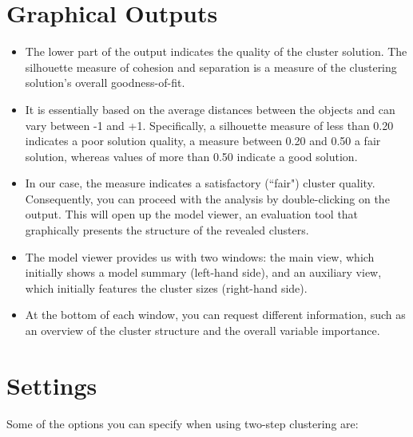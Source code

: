\documentclass[a4paper,12pt]{article}
\begin{document}
\section{Graphical Outputs}
\begin{itemize}
    \item 
The lower part of the output  indicates the quality of the cluster
solution. The silhouette measure of cohesion and separation is a measure of the
clustering solution’s overall goodness-of-fit. 
\item It is essentially based on the average
distances between the objects and can vary between -1 and +1. Specifically, a
silhouette measure of less than 0.20 indicates a poor solution quality, a measure
between 0.20 and 0.50 a fair solution, whereas values of more than 0.50 indicate a
good solution. 
\item In our case, the measure indicates a satisfactory (``fair") cluster quality. Consequently, you can
proceed with the analysis by double-clicking on the output. This will open up the
model viewer, an evaluation tool that graphically presents the structure
of the revealed clusters.
\item 

The model viewer provides us with two windows: the main view, which initially
shows a model summary (left-hand side), and an auxiliary view, which initially
features the cluster sizes (right-hand side).
\item At the bottom of each window, you can
request different information, such as an overview of the cluster structure and the
overall variable importance.
\end{itemize}


\section*{Settings}
Some of the options you can specify when using two-step clustering are:
\end{document}
